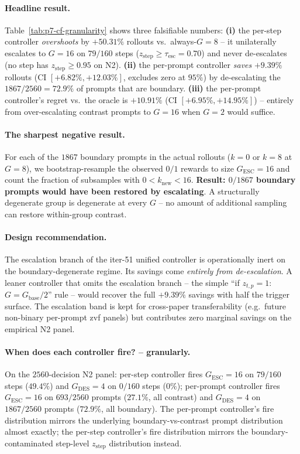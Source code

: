 \documentclass{article}
\begin{document}
\paragraph{Headline result.}
Table~\ref{tab:p7-cf-granularity} shows three falsifiable numbers:
\textbf{(i)} the per-step controller \emph{overshoots} by
$+50.31\%$ rollouts vs.\ always-$G{=}8$ -- it unilaterally
escalates to $G{=}16$ on $79/160$ steps ($z_{\mathrm{step}} \geq
\tau_{\mathrm{esc}}{=}0.70$) and never de-escalates (no step has
$z_{\mathrm{step}} \geq 0.95$ on N2). \textbf{(ii)} the per-prompt
controller \emph{saves} $+9.39\%$ rollouts
(CI $[+6.82\%, +12.03\%]$, excludes zero at $95\%$) by
de-escalating the $1867/2560 = 72.9\%$ of prompts that are boundary.
\textbf{(iii)} the per-prompt controller's regret vs.\ the oracle
is $+10.91\%$ (CI $[+6.95\%, +14.95\%]$) -- entirely from
over-escalating contrast prompts to $G{=}16$ when $G{=}2$ would
suffice.

\paragraph{The sharpest negative result.}
For each of the $1867$ boundary prompts in the actual rollouts
($k{=}0$ or $k{=}8$ at $G{=}8$), we bootstrap-resample the
observed $0/1$ rewards to size $G_{\mathrm{ESC}}{=}16$ and count
the fraction of subsamples with $0 < k_{\mathrm{new}} < 16$.
\textbf{Result: $0/1867$ boundary prompts would have been restored
by escalating}. A structurally degenerate group is degenerate at
every $G$ -- no amount of additional sampling can restore
within-group contrast.

\paragraph{Design recommendation.}
The escalation branch of the iter-51 unified controller is
operationally inert on the boundary-degenerate regime. Its savings
come \emph{entirely from de-escalation}. A leaner controller that
omits the escalation branch -- the simple
``if $z_{t,p}=1$: $G = G_{\mathrm{base}}/2$'' rule -- would
recover the full $+9.39\%$ savings with half the trigger surface.
The escalation band is kept for cross-paper transferability
(e.g.\ future non-binary per-prompt zvf panels) but contributes
zero marginal savings on the empirical N2 panel.

\paragraph{When does each controller fire? -- granularly.}
On the $2560$-decision N2 panel: per-step controller fires
$G_{\mathrm{ESC}}{=}16$ on $79/160$ steps ($49.4\%$) and
$G_{\mathrm{DES}}{=}4$ on $0/160$ steps ($0\%$); per-prompt
controller fires $G_{\mathrm{ESC}}{=}16$ on $693/2560$ prompts
($27.1\%$, all contrast) and $G_{\mathrm{DES}}{=}4$ on
$1867/2560$ prompts ($72.9\%$, all boundary). The per-prompt
controller's fire distribution mirrors the underlying
boundary-vs-contrast prompt distribution almost exactly; the
per-step controller's fire distribution mirrors the
boundary-contaminated step-level $z_{\mathrm{step}}$ distribution
instead.
\end{document}
